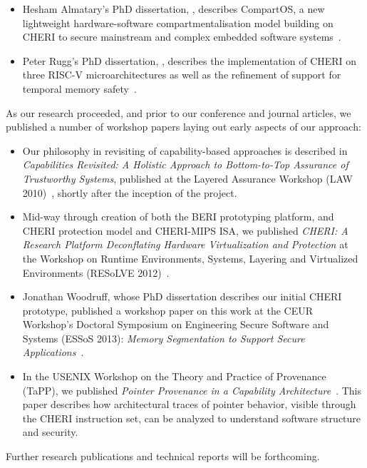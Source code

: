 \begin{itemize}
\item Hesham Almatary's PhD dissertation, ,
  describes CompartOS, a new lightweight hardware-software compartmentalisation
  model building on CHERI to secure mainstream and complex embedded software
  systems~\cite{UCAM-CL-TR-976}.

\item Peter Rugg's PhD dissertation, ,
  describes the implementation of CHERI on three RISC-V microarchitectures
  as well as the refinement of support for temporal memory
  safety~\cite{UCAM-CL-TR-984}.
\end{itemize}

As our research proceeded, and prior to our conference and journal articles,
we published a number of workshop papers laying out early aspects of our
approach:

\begin{itemize}
\item Our philosophy in revisiting of capability-based approaches is described
  in {\em Capabilities Revisited: A Holistic Approach to Bottom-to-Top
  Assurance of Trustworthy Systems}, published at the Layered Assurance
  Workshop (LAW 2010)~\cite{NeumannWatson10LAW}, shortly after the inception
  of the project.

\item Mid-way through creation of both the BERI prototyping platform, and
  CHERI protection model and CHERI-MIPS ISA, we published {\em CHERI: A
  Research Platform Deconflating Hardware Virtualization and Protection} at
  the Workshop on Runtime Environments, Systems, Layering and Virtualized
  Environments (RESoLVE 2012)~\cite{watson:cheriresolve2012}.

\item Jonathan Woodruff, whose PhD dissertation describes our initial CHERI
  prototype, published a workshop paper on this work at the CEUR Workshop's
  Doctoral Symposium on Engineering Secure Software and Systems (ESSoS 2013):
  \textit{Memory Segmentation to Support Secure
  Applications}~\cite{NeumannWatson10LAW}.

\item In the USENIX Workshop on the Theory and Practice of Provenance (TaPP),
  we published {\em Pointer Provenance in a Capability
  Architecture}~\cite{mazzinghi:pointer-provenance}.
  This paper describes how architectural traces of pointer behavior, visible
  through the CHERI instruction set, can be analyzed to understand software
  structure and security.
\end{itemize}

\noindent
Further research publications and technical reports will be forthcoming.
